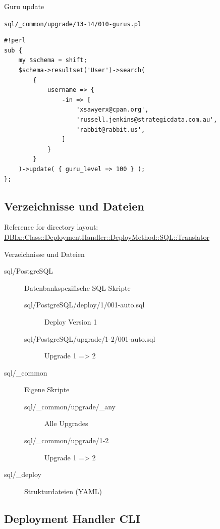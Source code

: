 \begin{frame}[fragile]{Guru update}

\verb|sql/_common/upgrade/13-14/010-gurus.pl|

\begin{lstlisting}
#!perl
sub {
    my $schema = shift;
    $schema->resultset('User')->search(
        {
            username => {
                -in => [
                    'xsawyerx@cpan.org',
                    'russell.jenkins@strategicdata.com.au',
                    'rabbit@rabbit.us',
                ]
            }
        }
    )->update( { guru_level => 100 } );
};

\end{lstlisting}
\end{frame}

\subsection{Verzeichnisse und Dateien}

Reference for directory layout:
\href{https://metacpan.org/pod/DBIx::Class::DeploymentHandler::DeployMethod::SQL::Translator}{DBIx::Class::DeploymentHandler::DeployMethod::SQL::Translator}

\begin{frame}[fragile]{Verzeichnisse und Dateien}
\begin{description}
\item[sql/PostgreSQL] Datenbankspezifische SQL-Skripte
\begin{description}
\item[sql/PostgreSQL/deploy/1/001-auto.sql] Deploy Version 1
\item[sql/PostgreSQL/upgrade/1-2/001-auto.sql] Upgrade 1 => 2
\end{description}
\item[sql/\_common] Eigene Skripte
\begin{description}
\item[sql/\_common/upgrade/\_any] Alle Upgrades
\item[sql/\_common/upgrade/1-2] Upgrade 1 => 2
\end{description}
\item[sql/\_deploy] Strukturdateien (YAML)
\end{description}
\end{frame}

\subsection{Deployment Handler CLI}

